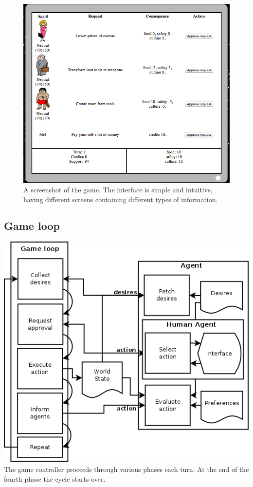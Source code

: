 \documentclass[11pt,a4paper]{article}
\begin{document}
      \begin{figure}[t]
      \centering
      \includegraphics[scale=0.5]{screenshot}
      \caption{A screenshot of the game. The interface is simple and intuitive, having different screens containing different types of information. }
      \label{fig:scr}
      \end{figure}
  \subsection{Game loop}
    \includegraphics[scale=0.25]{gameloop.png}\\
    The game controller proceeds through various phases each turn. At the end of the fourth phase the cycle starts over.
\end{document}
